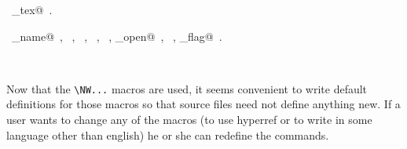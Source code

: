 \documentclass{report}
\begin{document}
\begin{flushleft}
\begin{minipage}{\linewidth}
\begin{list}{}{\setlength{\itemsep}{-\parsep}\setlength{\itemindent}{-\leftmargin}}
\item \NWtxtIdentsDefed\nobreak\  \verb@write_tex@\nobreak\ .\end{list}
\vspace{-2ex}
\footnotesize\addtolength{\baselineskip}{-1ex}
\begin{list}{}{\setlength{\itemsep}{-\parsep}\setlength{\itemindent}{-\leftmargin}}
\item \NWtxtIdentsUsed\nobreak\  \verb@command_name@\nobreak\ , \verb@fclose@\nobreak\ , \verb@FILE@\nobreak\ , \verb@fopen@\nobreak\ , \verb@fprintf@\nobreak\ , \verb@source_open@\nobreak\ , \verb@stderr@\nobreak\ , \verb@verbose_flag@\nobreak\ .\end{list}
\end{minipage}\\[4ex]
\end{flushleft}
Now that the \verb|\NW...| macros are used, it seems convenient
to write default definitions for those macros so that source files
need not define anything new. If a user wants to change any of 
the macros (to use hyperref or to write in some language other than
english) he or she can redefine the commands.
\end{document}

